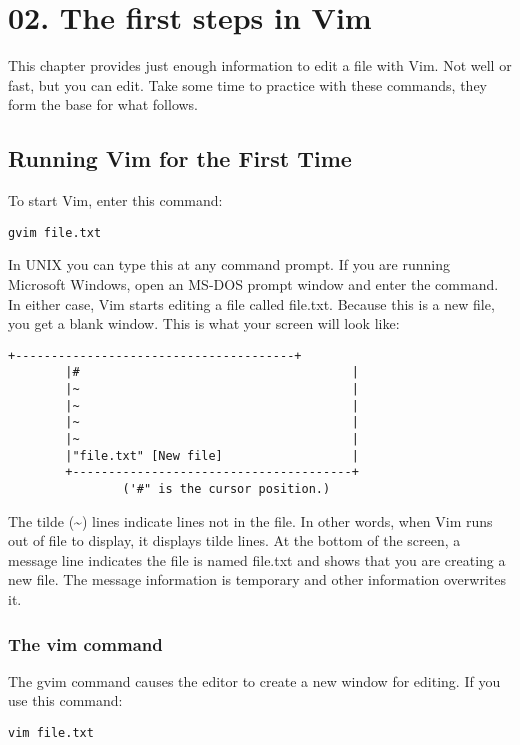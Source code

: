 \section{02. The first steps in Vim}
This chapter provides just enough information to edit a file with Vim.  Not
well or fast, but you can edit.  Take some time to practice with these
commands, they form the base for what follows.

\subsection{Running Vim for the First Time}
To start Vim, enter this command:

\begin{Verbatim}[samepage=true]
 gvim file.txt
\end{Verbatim}

In UNIX you can type this at any command prompt.
If you are running Microsoft Windows, open an MS-DOS prompt window and enter the command.
In either case, Vim starts editing a file called file.txt.
Because this is a new file, you get a blank window.
This is what your screen will look like:

\begin{Verbatim}[samepage=true]
		+---------------------------------------+
		|#                                      |
		|~                                      |
		|~                                      |
		|~                                      |
		|~                                      |
		|"file.txt" [New file]                  |
		+---------------------------------------+
				('#" is the cursor position.)
\end{Verbatim}

The tilde (\textasciitilde) lines indicate lines not in the file.
In other words, when Vim runs out of file to display, it displays tilde lines.
At the bottom of the screen, a message line indicates the file is named file.txt and shows that you are creating a new file.
The message information is temporary and other information overwrites it.

\subsubsection{The vim command}

The gvim command causes the editor to create a new window for editing.
If you use this command:

 \begin{Verbatim}[samepage=true]
 vim file.txt
 \end{Verbatim}

